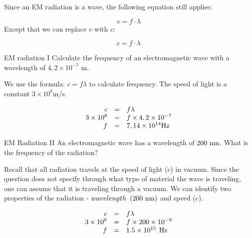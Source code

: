       \par \label{m38777*eip-808}Since an EM radiation is a wave, the following equation still applies:\par \label{m38777*eip-181}\nopagebreak\noindent{}
    \begin{equation}
    v=f\ensuremath{\cdot}\lambda
      \end{equation}
      \label{m38777*eip-601}Except that we can replace $v$ with $c$:\par \label{m38777*eip-194}\nopagebreak\noindent{}
    \begin{equation}
    c=f\ensuremath{\cdot}\lambda
      \end{equation}
      \par
            \label{m38777*eip-923}
      \noindent
      \begin{wex}{EM radiation I}{
      \label{m38777*id187899}Calculate the frequency of an electromagnetic wave with a wavelength of $4,2\ensuremath{\times}{10}^{-7}$ m.}
      { 
      \label{m38777*id187948}We use the formula: $c=f\lambda $ to calculate frequency. The speed of light is a constant $3\ensuremath{\times}{10}^{8}$m/s.\par 
    \begin{equation}
    \begin{array}{ccc}\hfill c& =& f\lambda \hfill \\ \hfill 3\ensuremath{\times}{10}^{8}& =& f\ensuremath{\times}4,2\ensuremath{\times}{10}^{-7}\hfill \\ \hfill f& =& 7,14\ensuremath{\times}{10}^{14}\text{Hz}\hfill \end{array}
      \end{equation}}    \end{wex}
 
      \begin{wex}{EM Radiation II}{
      \label{m38777*id188123}An electromagnetic wave has a wavelength of $200\phantom{\rule{3.33333pt}{0ex}}\text{nm}$. What is the frequency of the radiation?}{
      \label{m38777*id188341}Recall that all radiation travels at the speed of light ($c$) in vacuum.
Since the question does not specify through what type of material the wave
is traveling, one can assume that it is traveling through a vacuum.
We can identify two properties of the radiation - $wavelength\phantom{\rule{3.33333pt}{0ex}}\left(200\phantom{\rule{3.33333pt}{0ex}}\text{nm}\right)$ and speed ($c$).\par 
    \begin{equation}
    \begin{array}{ccc}\hfill c& =& f\lambda \hfill \\ \hfill 3\ensuremath{\times}{10}^{8}& =& f\ensuremath{\times}200\ensuremath{\times}{10}^{-9}\hfill \\ \hfill f& =& 1.5\ensuremath{\times}{10}^{15}\phantom{\rule{4pt}{0ex}}\text{Hz}\hfill \end{array}
      \end{equation}}    \end{wex}
